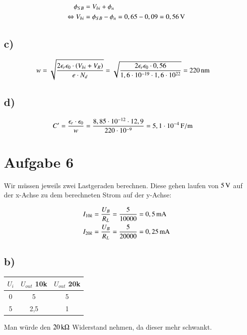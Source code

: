 \begin{align*}
\phi_{SB} &= V_{bi} + \phi_n \\
\Leftrightarrow V_{bi} &= \phi_{SB} - \phi_n = 0,65 - 0,09 = \unit[0,56]{V}
\end{align*}


\subsection*{c)}

\begin{align*}
w &= \sqrt{\frac{2 \epsilon_r \epsilon_0 \cdot \left( V_{bi} + V_R \right)}{e \cdot N_d}} = \sqrt{\frac{2 \epsilon_r \epsilon_0 \cdot 0,56}{1,6 \cdot 10^{-19} \cdot 1,6 \cdot 10^{22}}} = \unit[220]{nm}
\end{align*}


\subsection*{d)}

\begin{align*}
C' &= \frac{\epsilon_r \cdot \epsilon_0}{w} = \frac{8,85 \cdot 10^{-12} \cdot 12,9}{220 \cdot 10^{-9}} = \unit[5,1 \cdot 10^{-4}]{F/m}
\end{align*}


\section{Aufgabe 6}


Wir müssen jeweils zwei Lastgeraden berechnen. Diese gehen laufen von $\unit[5]{V}$ auf der x-Achse zu dem berechneten Strom auf der y-Achse:

\begin{align*}
I_{10k} &= \frac{U_B}{R_L} = \frac{5}{10000} = \unit[0,5]{mA} \\
I_{20k} &= \frac{U_B}{R_L} = \frac{5}{20000} = \unit[0,25]{mA}
\end{align*}



\subsection*{b)}

\begin{center}
	\begin{tabular}{c|c|c}
	$U_i$	& $U_{out}$ 10k & $U_{out}$ 20k \\ 
		\hline  
	0	& 5 & 5 \\ 
		\hline 
	5	& 2,5 & 1 \\ 
	\end{tabular} 
\end{center}


Man würde den $\unit[20]{k \Omega}$ Widerstand nehmen, da dieser mehr schwankt.















